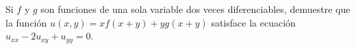 \item Si $f$ y $g$ son funciones de una sola variable dos veces diferenciables, demuestre que la función $u(x, y) = x f(x+y) + y g(x+y)$ satisface la ecuación $u_{xx} - 2u_{xy} + u_{yy} = 0$.
